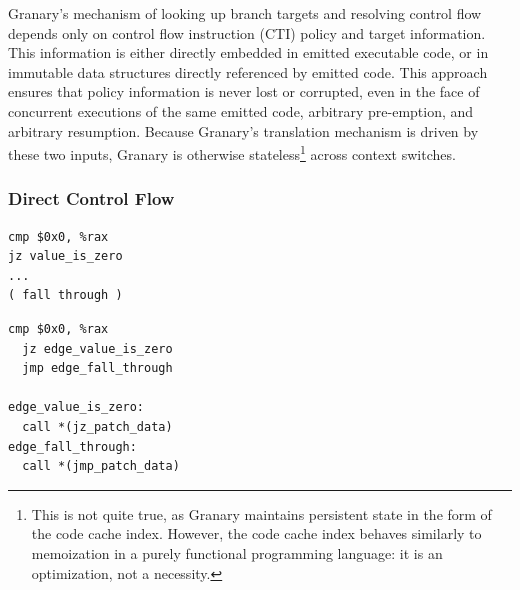 \documentclass[preprint]{sigplanconf}
\begin{document}
Granary's mechanism of looking up branch targets and resolving control flow depends only on control flow instruction (CTI) policy and target information. This information is either directly embedded in emitted executable code, or in immutable data structures directly referenced by emitted code. This approach ensures that policy information is never lost or corrupted, even in the face of concurrent executions of the same emitted code, arbitrary pre-emption, and arbitrary resumption. Because Granary's translation mechanism is driven by these two inputs, Granary is otherwise stateless\footnote{This is not quite true, as Granary maintains persistent state in the form of the code cache index. However, the code cache index behaves similarly to memoization in a purely functional programming language: it is an optimization, not a necessity.} across context switches.

\subsubsection{Direct Control Flow}\label{sec:direct_control_flow}
\lstset{language=[x64]Assembler}
\newsavebox\nativejcc
\begin{lrbox}{\nativejcc}
\begin{minipage}[b]{4cm}
\begin{lstlisting}[basicstyle=\scriptsize\ttfamily]
cmp $0x0, %rax
jz value_is_zero 
...
( fall through )
\end{lstlisting}
\end{minipage}
\end{lrbox}

\newsavebox\translatedjcc
\begin{lrbox}{\translatedjcc}\begin{minipage}[b]{4cm}\begin{lstlisting}[basicstyle=\scriptsize\ttfamily]
  cmp $0x0, %rax
  jz edge_value_is_zero
  jmp edge_fall_through

edge_value_is_zero:
  call *(jz_patch_data)
edge_fall_through:
  call *(jmp_patch_data)
\end{lstlisting}
\end{minipage}
\end{lrbox}
\end{document}
